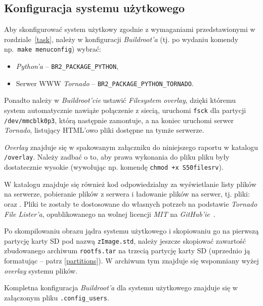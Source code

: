 \documentclass{article}
\begin{document}

\subsection{Konfiguracja systemu użytkowego}

Aby skonfigurować system użytkowy zgodnie z wymaganiami przedstawionymi w rozdziale~\ref{task}, należy w konfiguracji \emph{Buildroot'a} (tj. po wydaniu komendy np.~\texttt{make menuconfig}) wybrać:
\begin{itemize}
	\item \emph{Python'a} -- \texttt{BR2\_PACKAGE\_PYTHON},
	\item Serwer WWW \emph{Tornado} -- \texttt{BR2\_PACKAGE\_PYTHON\_TORNADO}.
\end{itemize}
Ponadto należy w \emph{Buildroot'cie} ustawić \emph{Filesystem overlay}, dzięki któremu system automatycznie nawiąże połączenie z siecią, uruchomi \texttt{fsck} dla partycji \texttt{/dev/mmcblk0p3}, którą następnie zamontuje, a na koniec uruchomi serwer \emph{Tornado}, listujący HTML'owo pliki dostępne na tymże serwerze.

\emph{Overlay} znajduje się w spakowanym załączniku do niniejszego raportu w katalogu \texttt{/overlay}. Należy zadbać o to, aby prawa wykonania do pliku  pliku były dostatecznie wysokie (wywołując np. komendę \texttt{chmod +x S50filesrv}).

W katalogu  znajduje się również kod odpowiedzialny za wyświetlanie listy plików na serwerze, pobieranie plików z serwera i ładowanie plików na serwer, tj. pliki:  oraz . Pliki te zostały te dostosowane do własnych potrzeb na podstawie \emph{Tornado File Lister'a}, opublikowanego na wolnej licencji \emph{MIT} na \emph{GitHub'ie}~\cite{www:file-lister}.

Po skompilowaniu obrazu jądra systemu użytkowego i skopiowaniu go na pierwszą partycję karty SD pod nazwą \texttt{zImage.std}, należy jeszcze skopiować zawartość zbudowanego archiwum \texttt{rootfs.tar} na trzecią partycję karty SD (uprzednio ją formatując -- patrz \ref{partitions}). W archiwum tym znajduje się wspomniany wyżej \emph{overlay} systemu plików.

Kompletna konfiguracja \emph{Buildroot'a} dla systemu użytkowego znajduje się w załączonym pliku \texttt{.config\_users}.
\end{document}
